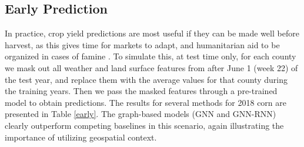 \subsection{Early Prediction}

In practice, crop yield predictions are most useful if they can be made well before harvest, as this gives time for markets to adapt, and humanitarian aid to be organized in cases of famine \cite{you2017deep}. To simulate this, at test time only, for each county we mask out all weather and land surface features from after June 1 (week 22) of the test year, and replace them with the average values for that county during the training years. Then we pass the masked features through a pre-trained model to obtain predictions. The results for several methods for 2018 corn are presented in Table \ref{early}. The graph-based models (GNN and GNN-RNN) clearly outperform competing baselines in this scenario, again illustrating the importance of utilizing geospatial context.



